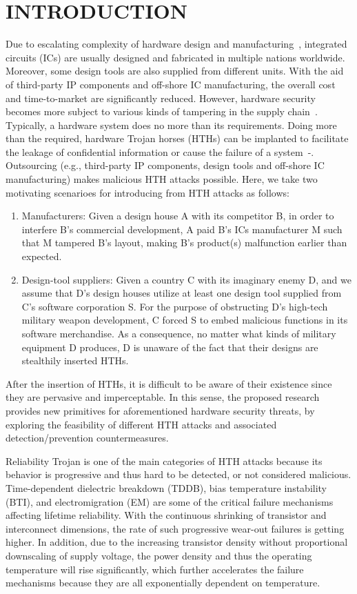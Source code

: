 \section{INTRODUCTION}
Due to escalating complexity of hardware design and manufacturing~\cite{wilson2013international}, integrated circuits (ICs) are usually designed and fabricated in multiple nations worldwide. Moreover, some design tools are also supplied from different units. With the aid of third-party IP components and off-shore IC manufacturing, the overall cost and time-to-market are significantly reduced. However, hardware security becomes more subject to various kinds of tampering in the supply chain~\cite{tehranipoor2011trustworthy}\cite{karri2010trustworthy}. Typically, a hardware system does no more than its requirements. Doing more than the required, hardware Trojan horses (HTHs) can be implanted to facilitate the leakage of confidential information or cause the failure of a system~\cite{adee2008hunt}-\cite{bhunia2014hardware}. Outsourcing (e.g., third-party IP components, design tools and off-shore IC manufacturing) makes malicious HTH attacks possible. Here, we take two motivating scenarioes for introducing from HTH attacks as follows:
\begin{enumerate}
	\item Manufacturers: Given a design house A with its competitor B, in order to interfere B's commercial development, A paid B's ICs manufacturer M such that M tampered B's layout, making B's product(s) malfunction earlier than expected.
	\item Design-tool suppliers: Given a country C with its imaginary enemy D, and we assume that D's design houses utilize at least one design tool supplied from C's software corporation S. For the purpose of obstructing D's high-tech military weapon development, C forced S to embed malicious functions in its software merchandise. As a consequence, no matter what kinds of military equipment D produces, D is unaware of the fact that their designs are stealthily inserted HTHs.
\end{enumerate}
After the insertion of HTHs, it is difficult to be aware of their existence since they are pervasive and imperceptable. In this sense, the proposed research provides new primitives for aforementioned hardware security threats, by exploring the feasibility of different HTH attacks and associated detection/prevention countermeasures.

Reliability Trojan is one of the main categories of HTH attacks because its behavior is progressive and thus hard to be detected, or not considered malicious. Time-dependent dielectric breakdown (TDDB), bias temperature instability (BTI), and electromigration (EM) are some of the critical failure mechanisms affecting lifetime reliability. With the continuous shrinking of transistor and interconnect dimensions, the rate of such progressive wear-out failures is getting higher. In addition, due to the increasing transistor density without proportional downscaling of supply voltage, the power density and thus the operating temperature will rise significantly, which further accelerates the failure mechanisms because they are all exponentially dependent on temperature. 

